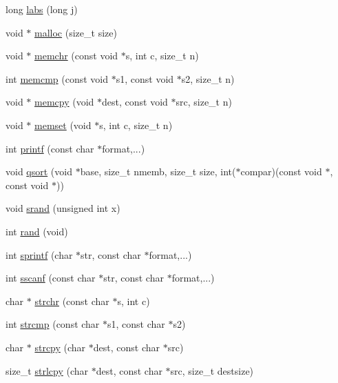 \begin{DoxyCompactItemize}
\item 
long \hyperlink{group__libxc_ga912277f2dbf3594e958d116ff2b35625}{labs} (long j)
\item 
void $\ast$ \hyperlink{group__libxc_ga7ac38fce3243a7dcf448301ee9ffd392}{malloc} (size\-\_\-t size)
\item 
void $\ast$ \hyperlink{group__libxc_ga16d6b0bd660cc3f9910924c6b6f4af8e}{memchr} (const void $\ast$s, int c, size\-\_\-t n)
\item 
int \hyperlink{group__libxc_ga9e6df54ee04e18a3772335580e2ed872}{memcmp} (const void $\ast$s1, const void $\ast$s2, size\-\_\-t n)
\item 
void $\ast$ \hyperlink{group__libxc_ga14938524dcbeb59d7117ba5e151ad1b1}{memcpy} (void $\ast$dest, const void $\ast$src, size\-\_\-t n)
\item 
void $\ast$ \hyperlink{group__libxc_gace6ee45c30e71865e6eb635200379db9}{memset} (void $\ast$s, int c, size\-\_\-t n)
\item 
int \hyperlink{group__libxc_ga98631211a4a8aee62f572375d5b637be}{printf} (const char $\ast$format,...)
\item 
void \hyperlink{group__libxc_ga216aaec88b41d3e2f8502a5b3365ea81}{qsort} (void $\ast$base, size\-\_\-t nmemb, size\-\_\-t size, int($\ast$compar)(const void $\ast$, const void $\ast$))
\item 
void \hyperlink{group__libxc_gaa76dd6cc9eff8b0475a781caf9782d73}{srand} (unsigned int x)
\item 
int \hyperlink{group__libxc_gae23144bcbb8e3742b00eb687c36654d1}{rand} (void)
\item 
int \hyperlink{group__libxc_ga3082155ec11e7229f7a20439b31a169e}{sprintf} (char $\ast$str, const char $\ast$format,...)
\item 
int \hyperlink{group__libxc_gaec1e54556dca3bd701d44395d34818dd}{sscanf} (const char $\ast$str, const char $\ast$format,...)
\item 
char $\ast$ \hyperlink{group__libxc_ga12871ed234858ef0e363d2b8aa572fc1}{strchr} (const char $\ast$s, int c)
\item 
int \hyperlink{group__libxc_ga11bd144d7d44914099a3aeddf1c8567d}{strcmp} (const char $\ast$s1, const char $\ast$s2)
\item 
char $\ast$ \hyperlink{group__libxc_ga7a82515b5d377be04817715c5465b647}{strcpy} (char $\ast$dest, const char $\ast$src)
\item 
size\-\_\-t \hyperlink{group__libxc_ga3e0c58f8ba41f9267161ffca2ea92558}{strlcpy} (char $\ast$dest, const char $\ast$src, size\-\_\-t destsize)

\end{DoxyCompactItemize}
